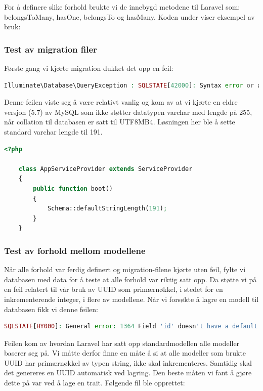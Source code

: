 For å definere slike forhold brukte vi de innebygd metodene til Laravel som: belongsToMany, hasOne, belongsTo og hasMany. Koden under viser eksempel av bruk:


\subsubsection{Test av migration filer}
Første gang vi kjørte migration dukket det opp en feil:
\begin{lstlisting}[caption={Feilmelding i Laravel ved kjøring av migration},language=PHP]
Illuminate\Database\QueryException : SQLSTATE[42000]: Syntax error or access violation: 1071 Specified key was too long; max key length is 767 bytes (SQL: alter table `users` add unique `users_email_unique`(`email`))
\end{lstlisting}
Denne feilen viste seg å være relativt vanlig og kom av at vi kjørte en eldre versjon (5.7) av MySQL som ikke støtter datatypen varchar med lengde på 255, når collation til databasen er satt til UTF8MB4. Løsningen her ble å sette standard varchar lengde til 191.
\begin{lstlisting}[language=PHP, caption={Definering av standard varchar lengde i AppServiceProvider.php}]
    <?php

    class AppServiceProvider extends ServiceProvider
    {
        public function boot()
        {
            Schema::defaultStringLength(191);
        }
    }
\end{lstlisting}

\subsubsection{Test av forhold mellom modellene}
Når alle forhold var ferdig definert og migration-filene kjørte uten feil, fylte vi databasen med data for å teste at alle forhold var riktig satt opp. Da støtte vi på en feil relatert til vår bruk av UUID som primærnøkkel, i stedet for en inkrementerende integer, i flere av modellene. Når vi forsøkte å lagre en modell til databasen fikk vi denne feilen:
\begin{lstlisting}[language=PHP]
    SQLSTATE[HY000]: General error: 1364 Field 'id' doesn't have a default value ...
\end{lstlisting}

Feilen kom av hvordan Laravel har satt opp standardmodellen alle modeller baserer seg på. Vi måtte derfor finne en måte å si at alle modeller som brukte UUID har primærnøkkel av typen string, ikke skal inkrementeres. Samtidig skal det genereres en UUID automatisk ved lagring. Den beste måten vi fant å gjøre dette på var ved å lage en trait. Følgende fil ble opprettet:


